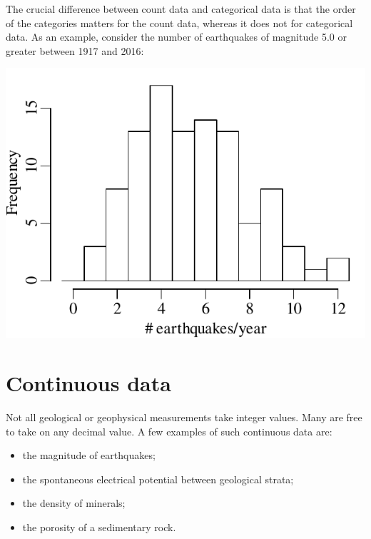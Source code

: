 The crucial difference between count data and categorical data is that
the order of the categories matters for the count data, whereas it
does not for categorical data.  As an example, consider the number of
earthquakes of magnitude 5.0 or greater between 1917 and 2016:

\noindent\begin{minipage}[t][][b]{.4\textwidth}
  \includegraphics[width=\textwidth]{../figures/declusteredquakesperyear.pdf}
\end{minipage}
\begin{minipage}[t][][t]{.6\textwidth}
  \label{fig:quakecounts}
\end{minipage}

\section{Continuous data}
\label{sec:continuous}

Not all geological or geophysical measurements take integer values.
Many are free to take on any decimal value. A few examples of such
continuous data are:

\begin{itemize}
\item the magnitude of earthquakes;
\item the spontaneous electrical potential between geological strata;
\item the density of minerals;
\item the porosity of a sedimentary rock.
\end{itemize}

